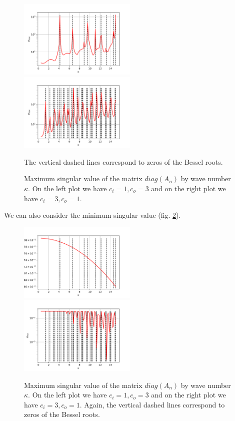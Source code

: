 \documentclass[10pt,journal,compsoc, onecolumn]{IEEEtran}
\begin{document}
\begin{figure}
    \includegraphics[width=0.5\textwidth]{scenario1MaximumSingVal.pdf}
    \includegraphics[width=0.5\textwidth]{scenario2MaximumSingVal.pdf}
    \caption{Maximum singular value of the matrix $diag(A_n)$ by wave number $\kappa$. 
    On the left plot we have $c_i = 1, c_o = 3$ 
    and on the right plot we have $c_i = 3, c_o = 1.$} The vertical dashed lines correspond to zeros of the Bessel roots. 
   \label{fig:max_sing_val}
\end{figure}
We can also consider the minimum singular value (fig. \ref{fig:min_sing_val}).
\begin{figure}
    \includegraphics[width=0.5\textwidth]{scenario1MinimumSingVal.pdf}
    \includegraphics[width=0.5\textwidth]{scenario2MinimumSingVal.pdf}
    \caption{Maximum singular value of the matrix $diag(A_n)$ by wave number $\kappa$. 
    On the left plot we have $c_i = 1, c_o = 3$ 
    and on the right plot we have $c_i = 3, c_o = 1.$ Again, the vertical dashed lines correspond to zeros of the Bessel roots. }
   \label{fig:min_sing_val}
\end{figure}
\end{document}
